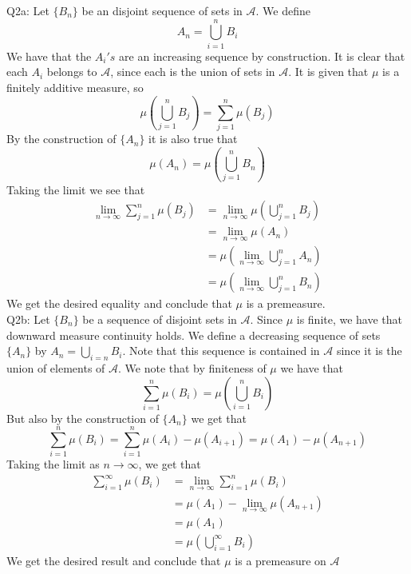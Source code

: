 \documentclass[letterpaper]{article}
\begin{document}
\noindent 
Q2a: Let $\{B_n\}$ be an disjoint sequence of sets in $\mathcal{A}$. We define $$A_n = \bigcup_{i=1}^n B_i$$ We have that the $A_i's$ are an increasing sequence by construction. 
It is clear that each $A_i$ belongs to $\mathcal{A}$, since each is the union of sets in $\mathcal{A}$.  
It is given that $\mu$ is a finitely additive measure, so $$\mu(\bigcup_{j=1}^n B_j) = \sum_{j=1}^n \mu(B_j)$$ By the construction of $\{A_n\}$ it is also true that $$\mu(A_n) = \mu(\bigcup_{j=1}^n B_n)$$
Taking the limit we see that 
\begin{align*}
    \lim_{n \to \infty} \sum_{j=1}^n \mu(B_j)& = \lim_{n \to \infty} \mu(\bigcup_{j=1}^n B_j)
    \\ & = \lim_{n \to \infty } \mu(A_n) \tag{by construction of $A_n$}
    \\ & = \mu(\lim_{n \to \infty} \bigcup_{j=1}^n A_n) \tag{by given measure continuity}
    \\ & = \mu(\lim_{n \to \infty} \bigcup_{j=1}^n B_n) \tag{by definition of $B_n$}
\end{align*}
 We get the desired equality and conclude that $\mu$ is a premeasure. 
\newline \\ \noindent 
Q2b: Let $\{B_n\}$ be a sequence of disjoint sets in $\mathcal{A}$.  Since $\mu$ is finite, we have that downward measure continuity holds. We define a decreasing sequence of sets $\{A_n\}$ by $A_n = \bigcup_{i=n} B_i $. Note that this sequence is contained in $\mathcal{A}$ since it is the union of elements of $\mathcal{A}$. 
We note that by finiteness of $\mu$ we have that $$\sum_{i=1}^n \mu(B_i) = \mu(\bigcup_{i=1}^n B_i)$$
But also by the construction of $\{A_n\}$ we get that $$\sum_{i=1}^n \mu(B_i) = \sum_{i=1}^n \mu(A_i) - \mu(A_{i+1}) = \mu(A_1) - \mu(A_{n+1})$$
Taking the limit as $n \to \infty$, we get that 
\begin{align*}
    \sum_{i=1}^ \infty \mu(B_i) & =  \lim_{n \to \infty} \sum_{i=1}^n \mu(B_i)
    \\ & = \mu(A_1) - \lim_{n \to \infty} \mu(A_{n+1})
    \\ & = \mu(A_1) \tag{by assumption of measure of nested sets}
    \\ & = \mu(\bigcup_{i=1}^\infty B_i)
\end{align*}
We get the desired result and conclude that $\mu$ is a premeasure on $\mathcal{A}$
\end{document}
